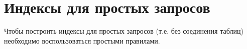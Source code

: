 \section{Индексы для простых запросов}

Чтобы построить индексы для простых запросов (т.е. без соединения таблиц) необходимо воспользоваться простыми правилами.






